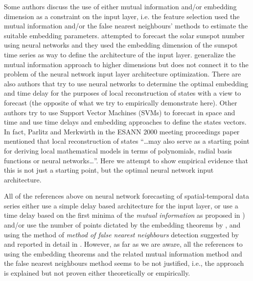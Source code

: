 \documentclass[journal]{IEEEtran}
\begin{document}
Some authors discuss the use of either mutual information and/or embedding dimension as a constraint on the input layer, i.e. the 
feature selection \cite{annunziato, Gkana201579, Zachilas2015, Sun2010109, HUANG20108590, 298224, Frank2001, 1998GeoRL..25..457K, 
BUHAMRA2003805, chandra2012cooperative, DBLP:journals/corr/MaslennikovaB14, sauter2010spatio, JiangS11, inputlayer, 1997IJMPC...8.1345K, 
1009-1963-12-6-304, Verdes2000, 1996SoPh..168..423F, 2007AdG....10...67L, Chandra:2012:CCE:2181341.2181747, raios, 
maass2003mathematical} used the mutual information and/or the false nearest neighbours' methods to estimate the suitable embedding 
parameters. \cite{0305-4470-28-12-012, 1995ApJ...444..916C, 1998GeoRL..25..457K, Zachilas2015, Chandra:2012:CCE:2181341.2181747, 
Gkana201579, raios} attempted to forecast the solar sunspot number using neural networks and they used the embedding dimension of the 
sunspot time series as way to define the architecture of the input layer. \cite{Simon:2007:HDS:1230147.1230294} generalize the mutual 
information approach to higher dimensions but does not connect it to the problem of the neural network input layer architecture 
optimization. There are also authors \cite{articleRagulskis} that try to use neural networks to determine the optimal embedding and time 
delay for the purposes of local reconstruction of states with a view to forecast (the opposite of what we try to empirically demonstrate 
here). Other authors \cite{Xia2006APF} try to use Support Vector Machines (SVMs) to forecast in space and time and use time delays and 
embedding approaches to define the states vectors. In fact, Parlitz and Merkwirth \cite{Parlitz2000NonlinearPO} in the
ESANN 2000 meeting proceedings paper mentioned that local reconstruction of states ``\ldots may also serve as
a starting point for deriving local mathematical models in terms of polynomials,
radial basis functions or neural networks\ldots''. Here we attempt to show empirical evidence that this is not just
a starting point, but the optimal neural network input architecture. 

All of the references above on neural network forecasting of spatial-temporal data series either use a simple delay based 
architecture for the input layer, or use a time delay based on the first minima of the {\em mutual information} as proposed in 
\cite{Fraser86, abarbanel1997analysis, opac-b1092652}) and/or use the number of points dictated by the embedding theorems by 
\cite{key1503303m}, \cite{1981LNM...898..366T, 1981LNM...898..230M} and \cite{1991JSP....65..579S} using the method of {\em method of 
false nearest neighbours} detection suggested by \cite{1992PhRvA..45.3403K} and reported in detail in \cite{1992PhRvA..45.7058M, 
1993RvMP...65.1331A, 1996PhT....49k..86A, abarbanel1997analysis}. However, as far as we are aware, all the references to using the 
embedding theorems and the related mutual information method and the false nearest neighbours method seems to be not justified, i.e., 
the approach is explained but not proven either theoretically or empirically. 
\end{document}
